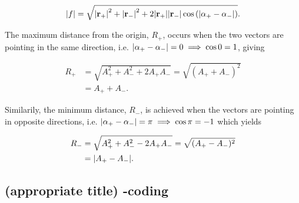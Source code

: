 \begin{equation}\label{eq:p3_magnitude_f}
    \abs{f} = \sqrt{\abs{\mathbf{r}_+}^2 + \abs{\mathbf{r}_-}^2 + 2\abs{\mathbf{r}_+}\abs{\mathbf{r_-}}\cos{(\abs{\alpha_+-\alpha_-})}}.
\end{equation}

The maximum distance from the origin, $R_+$, occurs when the two vectors are pointing in the same direction, i.e. $\abs{\alpha_+-\alpha_-} = 0 \implies \cos0=1$, giving 

\begin{equation}\label{eq:p4_Rplus}    
    \begin{split}
        R_+ &= \sqrt{A_+^2 + A_-^2 + 2A_+A_-} = \sqrt{(A_+ + A_-)^2} \\
        &= A_+ + A_-.
    \end{split}
\end{equation}

Similarily, the minimum distance, $R_-$, is achieved when the vectors are pointing in opposite directions, i.e. $\abs{\alpha_+-\alpha_-} = \pi \implies \cos\pi=-1$ which yields

\begin{equation}\label{eq:p4_Rminus}    
    \begin{split}
        R_- &= \sqrt{A_+^2 + A_-^2 - 2A_+A_-} = \sqrt{(A_+ - A_-)^2} \\
        &= \abs{A_+ - A_-}.
    \end{split}
\end{equation}











\subsection{(appropriate title) -coding}

